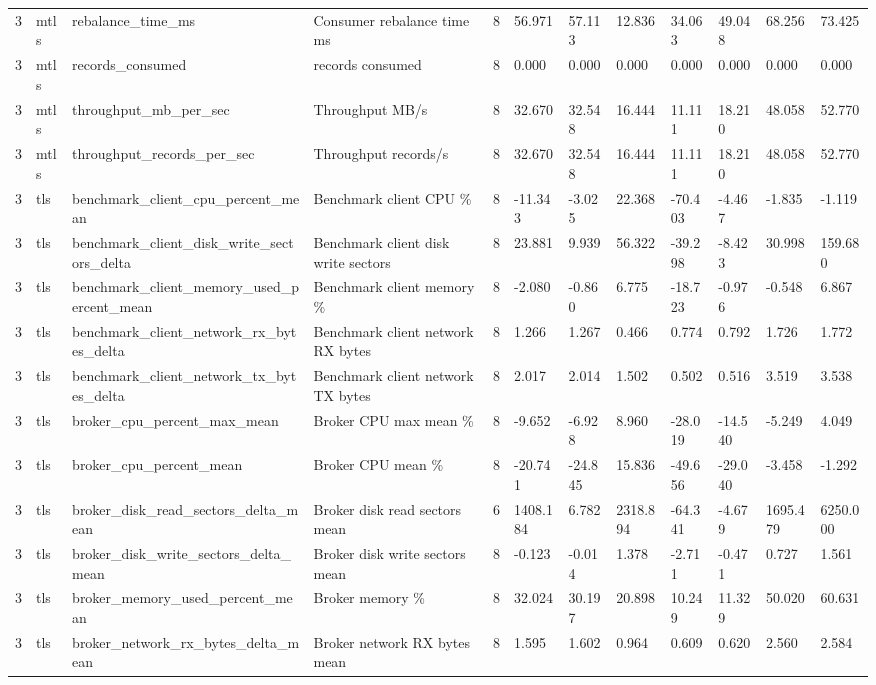 \begin{longtable}{llllllllllll}
3 & mtls & rebalance\_time\_ms & Consumer rebalance time ms & 8 & 56.971 & 57.113 & 12.836 & 34.063 & 49.048 & 68.256 & 73.425 \\
3 & mtls & records\_consumed & records consumed & 8 & 0.000 & 0.000 & 0.000 & 0.000 & 0.000 & 0.000 & 0.000 \\
3 & mtls & throughput\_mb\_per\_sec & Throughput MB/s & 8 & 32.670 & 32.548 & 16.444 & 11.111 & 18.210 & 48.058 & 52.770 \\
3 & mtls & throughput\_records\_per\_sec & Throughput records/s & 8 & 32.670 & 32.548 & 16.444 & 11.111 & 18.210 & 48.058 & 52.770 \\
3 & tls & benchmark\_client\_cpu\_percent\_mean & Benchmark client CPU \% & 8 & -11.343 & -3.025 & 22.368 & -70.403 & -4.467 & -1.835 & -1.119 \\
3 & tls & benchmark\_client\_disk\_write\_sectors\_delta & Benchmark client disk write sectors & 8 & 23.881 & 9.939 & 56.322 & -39.298 & -8.423 & 30.998 & 159.680 \\
3 & tls & benchmark\_client\_memory\_used\_percent\_mean & Benchmark client memory \% & 8 & -2.080 & -0.860 & 6.775 & -18.723 & -0.976 & -0.548 & 6.867 \\
3 & tls & benchmark\_client\_network\_rx\_bytes\_delta & Benchmark client network RX bytes & 8 & 1.266 & 1.267 & 0.466 & 0.774 & 0.792 & 1.726 & 1.772 \\
3 & tls & benchmark\_client\_network\_tx\_bytes\_delta & Benchmark client network TX bytes & 8 & 2.017 & 2.014 & 1.502 & 0.502 & 0.516 & 3.519 & 3.538 \\
3 & tls & broker\_cpu\_percent\_max\_mean & Broker CPU max mean \% & 8 & -9.652 & -6.928 & 8.960 & -28.019 & -14.540 & -5.249 & 4.049 \\
3 & tls & broker\_cpu\_percent\_mean & Broker CPU mean \% & 8 & -20.741 & -24.845 & 15.836 & -49.656 & -29.040 & -3.458 & -1.292 \\
3 & tls & broker\_disk\_read\_sectors\_delta\_mean & Broker disk read sectors mean & 6 & 1408.184 & 6.782 & 2318.894 & -64.341 & -4.679 & 1695.479 & 6250.000 \\
3 & tls & broker\_disk\_write\_sectors\_delta\_mean & Broker disk write sectors mean & 8 & -0.123 & -0.014 & 1.378 & -2.711 & -0.471 & 0.727 & 1.561 \\
3 & tls & broker\_memory\_used\_percent\_mean & Broker memory \% & 8 & 32.024 & 30.197 & 20.898 & 10.249 & 11.329 & 50.020 & 60.631 \\
3 & tls & broker\_network\_rx\_bytes\_delta\_mean & Broker network RX bytes mean & 8 & 1.595 & 1.602 & 0.964 & 0.609 & 0.620 & 2.560 & 2.584 \\

\end{longtable}
